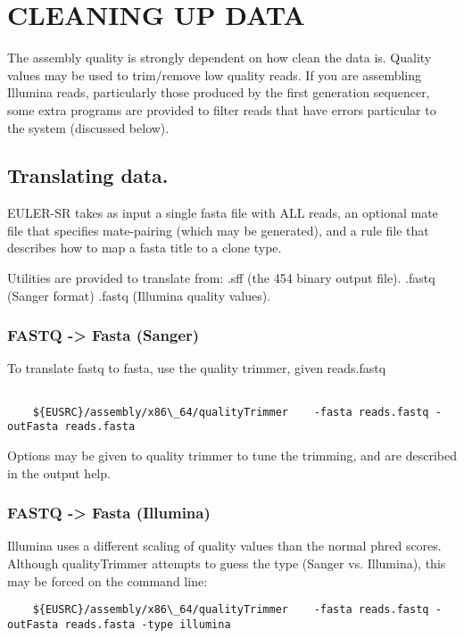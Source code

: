 \documentclass{article}[12pt]
\begin{document}
	

\section{CLEANING UP DATA}

The assembly quality is strongly dependent on how clean the data is.
Quality values may be used to trim/remove low quality reads.  If you
are assembling Illumina reads, particularly those produced by the
first generation sequencer, some extra programs are provided to filter
reads that have errors particular to the system (discussed below).

\subsection{Translating data.}

  EULER-SR takes as input a single fasta file with ALL reads, an
  optional mate file that specifies mate-pairing (which may be
  generated), and a rule file that describes how to map a fasta title
  to a clone type.

	Utilities are provided to translate from:
	  .sff (the 454 binary output file).
		.fastq (Sanger format)
		.fastq (Illumina quality values).

\subsubsection{FASTQ -> Fasta (Sanger)}

  To translate fastq to fasta, use the quality trimmer, given reads.fastq
\begin{verbatim}

	${EUSRC}/assembly/x86\_64/qualityTrimmer	-fasta reads.fastq -outFasta reads.fasta
\end{verbatim}

	Options may be given to quality trimmer to tune the trimming, and
	are described in the output help.

\subsubsection{FASTQ -> Fasta (Illumina)}
	
  Illumina uses a different scaling of quality values than the normal
  phred scores.  Although qualityTrimmer attempts to guess the type
  (Sanger vs. Illumina), this may be forced on the command line:

\begin{verbatim}
	${EUSRC}/assembly/x86\_64/qualityTrimmer	-fasta reads.fastq -outFasta reads.fasta -type illumina
\end{verbatim}
	
\end{document}
